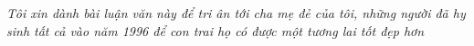 \clearpage
\thispagestyle{empty}
\begin{center}
	\vspace*{\fill}
	{\viet\textit{Tôi xin dành bài luận văn này để tri ân tới cha mẹ đẻ của tôi, những người đã hy sinh tất cả vào năm 1996 để con trai họ có được một tương lai tốt đẹp hơn}}
	\vspace*{\fill}
\end{center}
\clearpage
